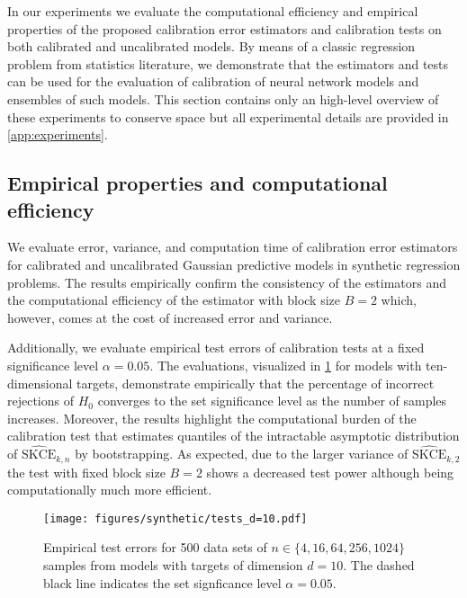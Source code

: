 \documentclass{article}
\begin{document}
In our experiments we evaluate the computational efficiency and empirical properties
of the proposed calibration error estimators and calibration tests on both calibrated
and uncalibrated models. By means of a classic regression problem from statistics
literature, we demonstrate that the estimators and tests can be used for the
evaluation of calibration of neural network models and ensembles of such models. This
section contains only an high-level overview of these experiments to conserve space but
all experimental details are provided in \cref{app:experiments}.

\subsection{Empirical properties and computational efficiency}

We evaluate error, variance, and computation time of calibration error
estimators for calibrated and uncalibrated Gaussian predictive models in synthetic
regression problems. The results empirically confirm the
consistency of the estimators and the computational efficiency of the estimator with
block size $B = 2$ which, however, comes at the cost of increased error and variance.

Additionally, we evaluate empirical test errors of calibration tests
at a fixed significance level $\alpha = 0.05$. The evaluations, visualized in
\cref{fig:synthetic_tests_10_main} for models with ten-dimensional targets, demonstrate
empirically that the percentage of incorrect rejections of $H_0$ converges to the set
significance level as the number of samples increases.
Moreover, the results highlight the computational burden of the calibration test
that estimates quantiles of the intractable asymptotic distribution of
$\widehat{\mathrm{SKCE}}_{k,n}$ by bootstrapping. As expected, due to the larger
variance of $\widehat{\mathrm{SKCE}}_{k,2}$ the test with fixed block size $B = 2$
shows a decreased test power although being computationally much more efficient.

\begin{figure}[!hbtp]
    \centering
    \texttt{[image: figures/synthetic/tests\_d=10.pdf]}
    \caption{Empirical test errors for 500 data sets of $n \in \{4, 16, 64, 256, 1024\}$
    samples from models with targets of dimension $d = 10$. The dashed black line
    indicates the set signficance level $\alpha = 0.05$.}%
    \label{fig:synthetic_tests_10_main}
    \vspace{-\baselineskip}
\end{figure}
\end{document}
